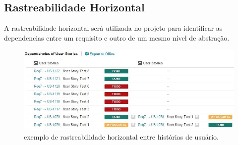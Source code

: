 	\subsection{Rastreabilidade Horizontal}
	A rastreabilidade horizontal será utilizada no projeto para identificar as dependencias entre um requisito e outro de um mesmo nível de abstração.

	\begin{figure}[!htb]
		\centering
		\includegraphics[width = \textwidth]{imagens/rastreabilidade_horizontal.jpg}
		\caption{exemplo de rastreabilidade horizontal entre histórias de usuário.}
		\label{imagem}
	\end{figure}
